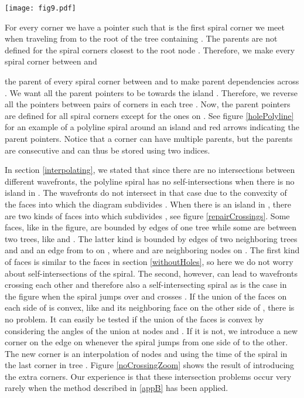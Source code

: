 \documentclass[3p]{elsarticle}
\begin{document}
\begin{figure*}
\centering
\texttt{[image: fig9.pdf]}
\caption{
A polyline spiral in black and red arrows from each corner  to its parents.
The cycle  is in blue and the diagram  is in gray.
}
\label{holePolyline}
\end{figure*}

For every corner  we have a pointer  such that  is
the first spiral corner we meet when traveling from  to the root  of the tree 
containing .
The parents are not defined for the spiral corners closest to the root node .
Therefore, we make every spiral corner between  and

the parent of every spiral corner between  and 
to make parent dependencies across .
We want all the parent pointers to be towards the island . Therefore, we reverse
all the pointers between pairs of corners in each tree . Now, the parent pointers
are defined for all spiral corners except for the ones on .
See figure \ref{holePolyline} for an example of a polyline spiral around an island and red arrows
indicating the parent pointers. Notice that a corner can have multiple parents, but the parents
are consecutive and can thus be stored using two indices.

In section \ref{interpolating}, we stated that since there are no intersections between different
wavefronts,
the polyline spiral has no self-intersections when there is no island in .
The wavefronts do not intersect in that
case due to the convexity of the faces into which the diagram  subdivides .
When there is an island  in ,
there are two kinds of faces into which  subdivides ,
see figure \ref{repairCrossings}. Some faces, like  in the figure, are bounded
by edges of one tree  while some are between two trees,
like  and . The latter kind is bounded by edges of two
neighboring
trees  and  and an edge  from  to  on , where  and  are neighboring nodes on .
The first kind of faces is similar to the faces in section \ref{withoutHoles},
so here we do not worry about
self-intersections of the spiral. The second, however, can lead to wavefronts crossing each other and
therefore also a self-intersecting spiral as is the case in the figure when the spiral jumps over  and
crosses . If the union of
the faces on each side of  is convex,
like  and its neighboring face on the other side of , there is no problem.
It can easily be tested if the union of the faces is convex by considering the angles of the union
at nodes  and . If it is not, we introduce a new corner
on the edge on  whenever the spiral jumps from one side of 
to the other. The new corner is an interpolation of nodes  and 
using the time of the spiral in the last corner in tree .
Figure \ref{noCrossingZoom} shows the result of introducing
the extra corners. Our experience is that these intersection problems occur very rarely
when the method described in \ref{appB} has been applied.
\end{document}
